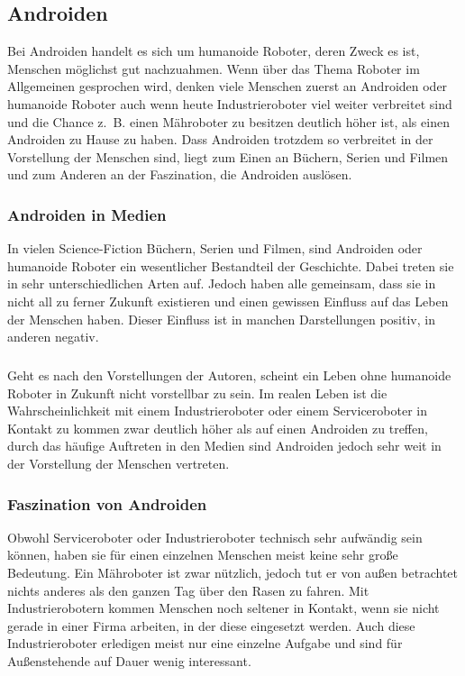 \subsection{Androiden}\label{sec:androiden}
Bei Androiden handelt es sich um humanoide Roboter, deren Zweck es ist, Menschen
möglichst gut nachzuahmen. Wenn über das Thema Roboter im Allgemeinen gesprochen
wird, denken viele Menschen zuerst an Androiden oder humanoide Roboter auch wenn heute
Industrieroboter viel weiter verbreitet sind und die Chance z.~B. einen
Mähroboter zu besitzen deutlich höher ist, als einen Androiden zu Hause zu
haben. Dass Androiden trotzdem so verbreitet in der Vorstellung der Menschen
sind, liegt zum Einen an Büchern, Serien und Filmen und zum Anderen an der
Faszination, die Androiden auslösen. \cite{Dautenhahn2011}

\subsubsection{Androiden in Medien}
In vielen Science-Fiction Büchern, Serien und Filmen, sind Androiden oder
humanoide Roboter ein wesentlicher Bestandteil der Geschichte. Dabei treten sie
in sehr unterschiedlichen Arten auf. Jedoch haben alle gemeinsam, dass sie in
nicht all zu ferner Zukunft existieren und einen gewissen Einfluss auf das Leben
der Menschen haben. Dieser Einfluss ist in manchen Darstellungen positiv, in
anderen negativ.

\subparagraph{}
Geht es nach den Vorstellungen der Autoren,
scheint ein Leben ohne humanoide Roboter in Zukunft nicht vorstellbar zu sein.
Im realen Leben ist die Wahrscheinlichkeit mit einem Industrieroboter oder einem
Serviceroboter in Kontakt zu kommen zwar deutlich höher als auf einen Androiden
zu treffen, durch das häufige Auftreten in den Medien sind Androiden jedoch
sehr weit in der Vorstellung der Menschen vertreten.

\subsubsection{Faszination von Androiden}
Obwohl Serviceroboter oder Industrieroboter technisch sehr aufwändig sein
können, haben sie für einen einzelnen Menschen meist keine sehr große Bedeutung.
Ein Mähroboter ist zwar nützlich, jedoch tut er von außen betrachtet nichts
anderes als den ganzen Tag über den Rasen zu fahren. Mit Industrierobotern
kommen Menschen noch seltener in Kontakt, wenn sie nicht gerade in einer Firma
arbeiten, in der diese eingesetzt werden. Auch diese Industrieroboter erledigen
meist nur eine einzelne Aufgabe und sind für Außenstehende auf Dauer wenig
interessant.

